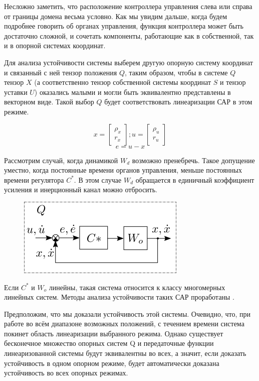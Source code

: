 \documentclass[a4paper]{article}
\begin{document}
Несложно заметить, что расположение контроллера управления слева или справа от границы домена весьма условно. Как мы увидим дальше, когда будем подробнее говорить об органах управления, функция контроллера может быть достаточно сложной, и сочетать компоненты, работающие как в собственной, так и в опорной системах координат.

Для анализа устойчивости системы выберем другую опорную систему координат и связанный с ней тензор положения $Q$, таким образом, чтобы в системе $Q$ тензор $X$ (а соответственно тензор собственной системы координат $S$ и тензор уставки $U$) оказались малыми и могли быть эквивалентно представлены в векторном виде. Такой выбор $Q$ будет соответствовать линеаризации САР в этом режиме.

\begin{equation}
x = \begin{bmatrix}\rho_x\\r_x\end{bmatrix};  
u = \begin{bmatrix}\rho_u\\r_u\end{bmatrix}
\end{equation}
\begin{equation}
e = u - x
\end{equation}

Рассмотрим случай, когда динамикой $W_d$ возможно пренебречь. Такое допущение уместно, когда постоянные времени органов управления, меньше постоянных времени регулятора $C^*$. В этом случае $W_{d}$ обращается в единичный коэффициент усиления и инерционный канал можно отбросить. 

{
\begin{figure}[H]
\centering
\includegraphics{./src/sheme4.png}
\end{figure}
}

Если $C^*$ и $W_o$ линейны, такая система относится к классу многомерных линейных систем. Методы анализа устойчивости таких САР проработаны \cite{tau}.

Предположим, что мы доказали устойчивость этой системы. Очевидно, что, при работе во всём диапазоне возможных положений, с течением времени система покинет область линеаризации выбранного режима. Однако существует бесконечное множество опорных систем Q и передаточные функции линеаризованной системы будут эквивалентны во всех, а значит, если доказать устойчивость в одном опорном режиме, будет автоматически доказана устойчивость во всех опорных режимах. 
\end{document}
